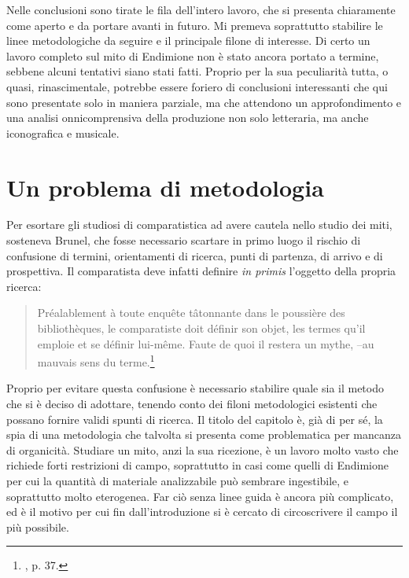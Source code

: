 \documentclass[12pt,a4paper,openright, oneside]{book}
\begin{document}
Nelle conclusioni sono tirate le fila dell'intero lavoro, che si presenta chiaramente come aperto e da portare avanti in futuro. Mi premeva soprattutto stabilire le linee metodologiche da seguire e il principale filone di interesse. Di certo un lavoro completo sul mito di Endimione non è stato ancora portato a termine, sebbene alcuni tentativi siano stati fatti. Proprio per la sua peculiarità tutta, o quasi, rinascimentale, potrebbe essere foriero di conclusioni interessanti che qui sono presentate solo in maniera parziale, ma che attendono un approfondimento e una analisi onnicomprensiva della produzione non solo letteraria, ma anche iconografica e musicale.

\renewcommand{\thechapter}{\arabic{chapter}} 
\chapter{Un problema di metodologia}
\renewcommand{\thesection}{\thechapter. \arabic{section}}
Per esortare gli studiosi di comparatistica ad avere cautela nello studio  dei miti, sosteneva Brunel, che fosse necessario scartare in primo luogo il rischio di confusione di termini, orientamenti di ricerca, punti di partenza, di arrivo e di prospettiva. Il comparatista deve infatti definire \textit{in primis} l'oggetto della propria ricerca:

\begin{quote}\begin{singlespace}
\footnotesize{Préalablement à toute enqu\^ete t\^atonnante dans le poussière des bibliothèques, le comparatiste doit définir son objet, les termes qu'il emploie et se définir lui-m\^eme. Faute de quoi il restera un mythe, --au mauvais sens du terme.}\footnote{\cite{Brunel1}, p. 37.}\end{singlespace}\end{quote}
Proprio per evitare questa confusione è necessario stabilire quale sia il metodo che si è deciso di adottare, tenendo conto dei filoni metodologici esistenti che possano fornire validi spunti di ricerca. Il titolo del capitolo è, già di per sé, la spia di una metodologia che talvolta si presenta come problematica per mancanza di organicità.  Studiare un mito, anzi la sua ricezione, è un lavoro molto vasto che richiede forti restrizioni di campo, soprattutto in casi come quelli di Endimione per cui la quantità di materiale analizzabile può sembrare ingestibile, e soprattutto molto eterogenea. Far ciò senza linee guida è ancora più complicato, ed è il motivo per cui fin dall'introduzione si è cercato di circoscrivere il campo il più possibile. 
\end{document}
